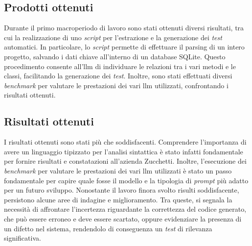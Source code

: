     \subsection{Prodotti ottenuti}
    Durante il primo macroperiodo di lavoro sono stati ottenuti diversi risultati, tra cui la realizzazione di uno \textit{script} per l'estrazione e la generazione dei \textit{test} automatici.
    In particolare, lo \textit{script} permette di effettuare il parsing di un intero progetto, salvando i dati chiave all'interno di un database SQLite.
    Questo procedimento consente all'\gls{llm} di individuare le relazioni tra i vari metodi e le classi, facilitando la generazione dei \textit{test}.
    Inoltre, sono stati effettuati diversi \textit{benchmark} per valutare le prestazioni dei vari \gls{llm} utilizzati, confrontando i risultati ottenuti.

    \subsection{Risultati ottenuti}
        I risultati ottenuti sono stati più che soddisfacenti. Comprendere l'importanza di avere un linguaggio tipizzato per l'analisi sintattica è stato infatti fondamentale per fornire risultati e constatazioni all'azienda Zucchetti.
        Inoltre, l'esecuzione dei \textit{benchmark} per valutare le prestazioni dei vari \gls{llm} utilizzati è stato un passo fondamentale 
        per capire quale fosse il modello e la tipologia di \textit{prompt} più adatto per un futuro sviluppo. 
        Nonostante il lavoro finora svolto risulti soddisfacente, persistono alcune aree di indagine e miglioramento. 
        Tra queste, si segnala la necessità di affrontare l'incertezza riguardante la correttezza del codice generato, 
        che può essere erroneo e deve essere scartato, oppure evidenziare la presenza di un difetto nel sistema, rendendolo di conseguenza un \textit{test} di rilevanza significativa.
